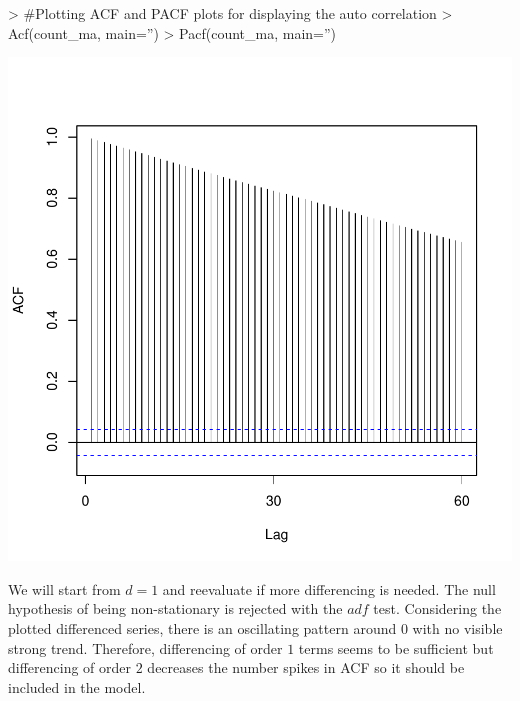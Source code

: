 \documentclass{article}
\begin{document}
\begin{Schunk}
\begin{Sinput}
> #Plotting ACF and PACF plots for displaying the auto correlation
> Acf(count_ma, main='')
> Pacf(count_ma, main='')
\end{Sinput}
\end{Schunk}
\includegraphics{Report-014}

We will start from $d=1$ and reevaluate if more differencing is needed. The null hypothesis of being non-stationary is rejected with the $adf$ test. Considering the plotted differenced series, there is an oscillating pattern around $0$ with no visible strong trend. Therefore, differencing of order $1$ terms seems to be sufficient but differencing of order $2$ decreases the number spikes in ACF so it should be included in the model. 
\end{document}
